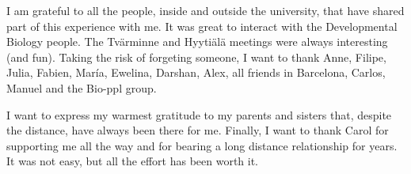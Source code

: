 \vspace{1ex}
I am grateful to all the people, inside and outside the university, that have shared part of this experience with me. It was great to interact with the Developmental Biology people. The Tv\"{a}rminne and Hyyti\"{a}l\"{a} meetings were always interesting (and fun). Taking the risk of forgeting someone, I want to thank Anne, Filipe, Julia, Fabien, Mar\'{i}a, Ewelina, Darshan, Alex, all friends in Barcelona, Carlos, Manuel and the Bio-ppl group.

\vspace{1ex}

I want to express my warmest gratitude to my parents and sisters that, despite the distance, have always been there for me.
Finally, I want to thank Carol for supporting me all the way and for bearing a long distance relationship for years. It was not easy, but all the effort has been worth it.